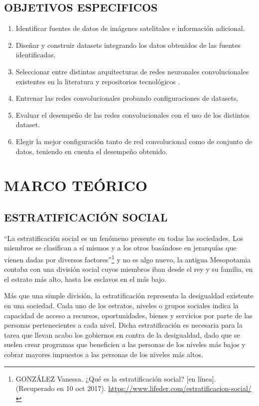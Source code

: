     \section{OBJETIVOS ESPECIFICOS}
    \begin{enumerate}
      \item Identificar fuentes de datos de imágenes satelitales e información adicional.
      \item Diseñar y construir datasets integrando los datos obtenidos de las fuentes identificadas.
      \item Seleccionar entre distintas arquitecturas de redes neuronales convolucionales existentes en la literatura y repositorios tecnológicos    .
      \item Entrenar las redes convolucionales probando configuraciones de datasets.
      \item Evaluar el desempeño de las redes convolucionales con el uso de los distintos dataset. 
      \item Elegir la mejor configuración tanto de red convolucional como de conjunto de datos, teniendo en cuenta el desempeño obtenido.   
    \end{enumerate}


    \newpage\chapter{MARCO TEÓRICO} 
    
    
	\section{ESTRATIFICACIÓN SOCIAL}
    
    “La estratificación social es un fenómeno presente en todas las sociedades. Los miembros se clasifican a sí mismos y a los otros basándose en jerarquías que vienen dadas por diversos factores”\footnote[8]{GONZÁLEZ Vanessa. ¿Qué es la estratificación social? [en línea]. (Recuperado en 10 oct 2017). \url{https://www.lifeder.com/estratificacion-social/}} y no es algo nuevo, la antigua Mesopotamia contaba con una división social cuyos miembros iban desde el rey y su familia, en el estrato más alto, hasta los esclavos en el más bajo.
    
    Más que una simple división, la estratificación representa la desigualdad existente en una sociedad. Cada uno de los estratos, niveles o grupos sociales indica la capacidad de acceso a recursos, oportunidades, bienes y servicios por parte de las personas pertenecientes a cada nivel. Dicha estratificación es necesaria para la tarea que llevan acabo los gobiernos en contra de la desigualdad, dado que se suelen crear programas que beneficien a las personas de los niveles más bajos y cobrar mayores impuestos a las personas de los niveles más altos.
    
